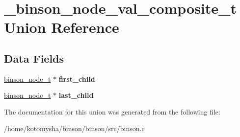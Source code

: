\hypertarget{union__binson__node__val__composite__t}{\section{\-\_\-binson\-\_\-node\-\_\-val\-\_\-composite\-\_\-t Union Reference}
\label{union__binson__node__val__composite__t}
}
\subsection*{Data Fields}
\begin{DoxyCompactItemize}
\item 
\hypertarget{union__binson__node__val__composite__t_a08c694c3ad49e3067fb3204c70f3d741}{\hyperlink{struct__binson__node__t}{binson\-\_\-node\-\_\-t} $\ast$ {\bfseries first\-\_\-child}}\label{union__binson__node__val__composite__t_a08c694c3ad49e3067fb3204c70f3d741}

\item 
\hypertarget{union__binson__node__val__composite__t_a37b712b631802fba4e8a547c5bd925ab}{\hyperlink{struct__binson__node__t}{binson\-\_\-node\-\_\-t} $\ast$ {\bfseries last\-\_\-child}}\label{union__binson__node__val__composite__t_a37b712b631802fba4e8a547c5bd925ab}

\end{DoxyCompactItemize}


The documentation for this union was generated from the following file\-:\begin{DoxyCompactItemize}
\item 
/home/kotomysha/binson/binson/src/binson.\-c\end{DoxyCompactItemize}
